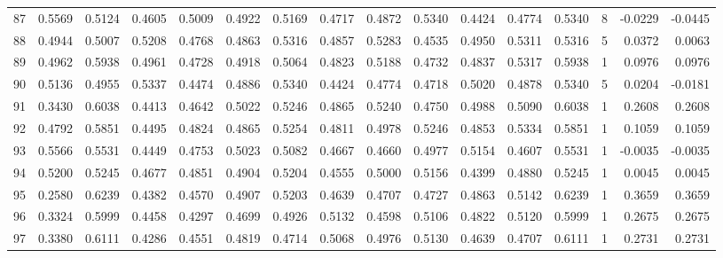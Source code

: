 \begin{tabular}{lrrrrrrrrrrrrrrr}
87  &      0.5569 &  0.5124 &  0.4605 &  0.5009 &  0.4922 &  0.5169 &  0.4717 &  0.4872 &  0.5340 &  0.4424 &   0.4774 &     0.5340 &      8 &                   -0.0229 &                    -0.0445 \\
88  &      0.4944 &  0.5007 &  0.5208 &  0.4768 &  0.4863 &  0.5316 &  0.4857 &  0.5283 &  0.4535 &  0.4950 &   0.5311 &     0.5316 &      5 &                    0.0372 &                     0.0063 \\
89  &      0.4962 &  0.5938 &  0.4961 &  0.4728 &  0.4918 &  0.5064 &  0.4823 &  0.5188 &  0.4732 &  0.4837 &   0.5317 &     0.5938 &      1 &                    0.0976 &                     0.0976 \\
90  &      0.5136 &  0.4955 &  0.5337 &  0.4474 &  0.4886 &  0.5340 &  0.4424 &  0.4774 &  0.4718 &  0.5020 &   0.4878 &     0.5340 &      5 &                    0.0204 &                    -0.0181 \\
91  &      0.3430 &  0.6038 &  0.4413 &  0.4642 &  0.5022 &  0.5246 &  0.4865 &  0.5240 &  0.4750 &  0.4988 &   0.5090 &     0.6038 &      1 &                    0.2608 &                     0.2608 \\
92  &      0.4792 &  0.5851 &  0.4495 &  0.4824 &  0.4865 &  0.5254 &  0.4811 &  0.4978 &  0.5246 &  0.4853 &   0.5334 &     0.5851 &      1 &                    0.1059 &                     0.1059 \\
93  &      0.5566 &  0.5531 &  0.4449 &  0.4753 &  0.5023 &  0.5082 &  0.4667 &  0.4660 &  0.4977 &  0.5154 &   0.4607 &     0.5531 &      1 &                   -0.0035 &                    -0.0035 \\
94  &      0.5200 &  0.5245 &  0.4677 &  0.4851 &  0.4904 &  0.5204 &  0.4555 &  0.5000 &  0.5156 &  0.4399 &   0.4880 &     0.5245 &      1 &                    0.0045 &                     0.0045 \\
95  &      0.2580 &  0.6239 &  0.4382 &  0.4570 &  0.4907 &  0.5203 &  0.4639 &  0.4707 &  0.4727 &  0.4863 &   0.5142 &     0.6239 &      1 &                    0.3659 &                     0.3659 \\
96  &      0.3324 &  0.5999 &  0.4458 &  0.4297 &  0.4699 &  0.4926 &  0.5132 &  0.4598 &  0.5106 &  0.4822 &   0.5120 &     0.5999 &      1 &                    0.2675 &                     0.2675 \\
97  &      0.3380 &  0.6111 &  0.4286 &  0.4551 &  0.4819 &  0.4714 &  0.5068 &  0.4976 &  0.5130 &  0.4639 &   0.4707 &     0.6111 &      1 &                    0.2731 &                     0.2731 \\

\end{tabular}
